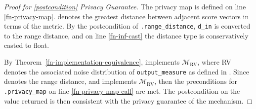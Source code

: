 \documentclass{article}
\begin{document}
\begin{proof}[Proof for \ref{postcondition} Privacy Guarantee]
    The privacy map is defined on line \ref{fn-privacy-map}.
    \din denotes the greatest distance between adjacent score vectors in terms of the  metric.
    By the postcondition of \texttt{.range\_distance}, \texttt{d\_in} is converted to the range distance,
    and on line \ref{fn-inf-cast} the distance type is conservatively casted to float.

    By Theorem~\ref{fn-implementation-equivalence}, \function implements $\mathcal{M}_\mathrm{RV}$,
    where RV denotes the associated noise distribution of \texttt{output\_measure} as defined in .
    Since \din denotes the range distance, and \function implements $\mathcal{M}_\mathrm{RV}$,
    then the preconditions for \texttt{.privacy_map} on line \ref{fn-privacy-map-call} are met.
    The postcondition on the value returned is then consistent with the privacy guarantee of the mechanism.
\end{proof} 
 
 
 
 
\end{document}
